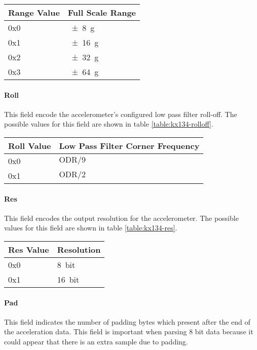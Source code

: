 \begin{table*}[htb]
    \centering
    \begin{tabular}{@{}ll@{}}
        \toprule
        Range Value & Full Scale Range \\
        \midrule
        0x0         & {\SI{\pm 8}{g}}  \\
        0x1         & {\SI{\pm 16}{g}} \\
        0x2         & {\SI{\pm 32}{g}} \\
        0x3         & {\SI{\pm 64}{g}} \\
        \bottomrule
    \end{tabular}
    \caption{KX134-1211 Full Scale Range Values}
    \label{table:kx134-fsr}
\end{table*}

\paragraph{Roll}
This field encode the accelerometer's configured low pass filter roll-off. The possible values for this field are shown
in table \ref{table:kx134-rolloff}.

\begin{table*}[htb]
    \centering
    \begin{tabular}{@{}ll@{}}
        \toprule
        Roll Value & Low Pass Filter Corner Frequency \\
        \midrule
        0x0        & $\text{ODR} / 9$                 \\
        0x1        & $\text{ODR} / 2$                 \\
        \bottomrule
    \end{tabular}
    \caption{KX134-1211 Low Pass Filter Rolloff Values}
    \label{table:kx134-rolloff}
\end{table*}

\paragraph{Res}
This field encodes the output resolution for the accelerometer. The possible values for this field are shown in table
\ref{table:kx134-res}.

\begin{table*}[htb]
    \centering
    \begin{tabular}{@{}ll@{}}
        \toprule
        Res Value & Resolution     \\
        \midrule
        0x0       & {\SI{8}{bit}}  \\
        0x1       & {\SI{16}{bit}} \\
        \bottomrule
    \end{tabular}
    \caption{KX134-1211 Resolution Values}
    \label{table:kx134-res}
\end{table*}

\paragraph{Pad}
This field indicates the number of padding bytes which present after the end of the acceleration data. This field is
important when parsing 8 bit data because it could appear that there is an extra sample due to padding.
